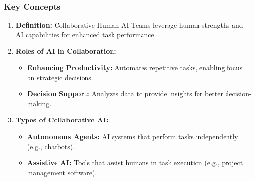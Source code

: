\documentclass[aspectratio=169]{beamer}
\begin{document}
\begin{frame}[fragile]
    \frametitle{Key Concepts}
    \begin{enumerate}
        \item \textbf{Definition:} Collaborative Human-AI Teams leverage human strengths and AI capabilities for enhanced task performance.
        \item \textbf{Roles of AI in Collaboration:}
        \begin{itemize}
            \item \textbf{Enhancing Productivity:} Automates repetitive tasks, enabling focus on strategic decisions.
            \item \textbf{Decision Support:} Analyzes data to provide insights for better decision-making.
        \end{itemize}
        \item \textbf{Types of Collaborative AI:}
        \begin{itemize}
            \item \textbf{Autonomous Agents:} AI systems that perform tasks independently (e.g., chatbots).
            \item \textbf{Assistive AI:} Tools that assist humans in task execution (e.g., project management software).
        \end{itemize}
    \end{enumerate}
\end{frame}
\end{document}
